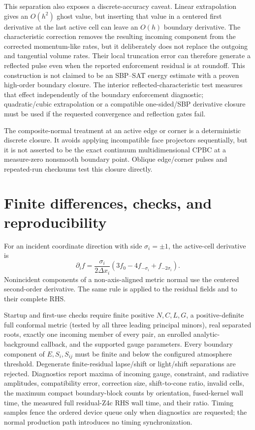\documentclass[11pt]{article}
\begin{document}
This separation also exposes a discrete-accuracy caveat.  Linear
extrapolation gives an \(O(h^2)\) ghost value, but inserting that value in a
centered first derivative at the last active cell can leave an \(O(h)\)
boundary derivative.  The characteristic correction removes the resulting
incoming component from the corrected momentum-like rates, but it deliberately
does not replace the outgoing and tangential volume rates.  Their local
truncation error can therefore generate a reflected pulse even when the
reported enforcement residual is at roundoff.  This construction is not
claimed to be an SBP--SAT energy estimate with a proven high-order boundary
closure.  The interior reflected-characteristic test measures that effect
independently of the boundary enforcement diagnostic; quadratic/cubic
extrapolation or a compatible one-sided/SBP derivative closure must be used if
the requested convergence and reflection gates fail.

The composite-normal treatment at an active edge or corner is a deterministic
discrete closure.  It avoids applying incompatible face projectors
sequentially, but it is not asserted to be the exact continuum
multidimensional CPBC at a measure-zero nonsmooth boundary point.  Oblique
edge/corner pulses and repeated-run checksums test this closure directly.

\section{Finite differences, checks, and reproducibility}

For an incident coordinate direction with side
\(\sigma_i=\pm1\), the active-cell derivative is
\[
 \partial_i f
 =\frac{\sigma_i}{2\Delta x_i}
  \left(3f_0-4f_{-\sigma_i}+f_{-2\sigma_i}\right).
\]
Nonincident components of a non-axis-aligned metric normal use the centered
second-order derivative.  The same rule is applied to the residual fields and
to their complete RHS.

Startup and first-use checks require finite positive \(N,C,L,G\), a
positive-definite full conformal metric (tested by all three leading principal
minors), real separated roots, exactly one incoming member of every pair, an
enrolled analytic-background callback, and the supported gauge parameters.
Every boundary component of \(E,S_i,S_{ij}\) must be finite and below the
configured atmosphere threshold.  Degenerate finite-residual lapse/shift or
light/shift separations are rejected.  Diagnostics report maxima of incoming
gauge, constraint, and radiative amplitudes, compatibility error, correction
size, shift-to-cone ratio, invalid cells, the maximum compact boundary-block
counts by orientation, fused-kernel wall time, the measured full residual-Z4c
RHS wall time, and their ratio.  Timing samples fence the ordered device queue
only when diagnostics are requested; the normal production path introduces
no timing synchronization.
\end{document}
